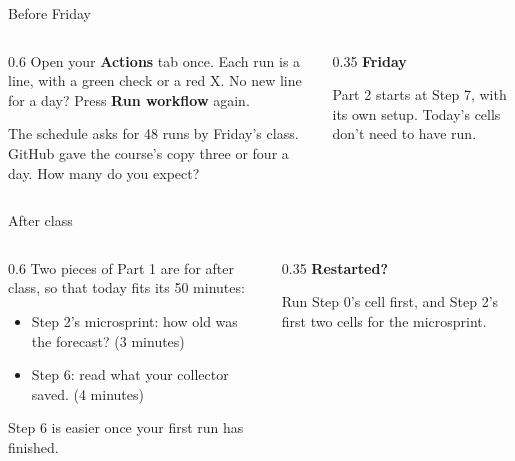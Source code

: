 \documentclass[9pt,aspectratio=169]{beamer}
\begin{document}
\begin{frame}{Before Friday}
    \begin{columns}[T]
        \begin{column}{0.6\textwidth}
            Open your \textbf{Actions} tab once. Each run is a line, with a green check or a red X. No new line for a day? Press \textbf{Run workflow} again.

            \medskip
            The schedule asks for 48 runs by Friday's class. GitHub gave the course's copy three or four a day. How many do you expect?
        \end{column}
        \begin{column}{0.35\textwidth}
            \textbf{Friday}\\[2pt]
            {\footnotesize Part 2 starts at Step 7, with its own setup. Today's cells don't need to have run.\par}
        \end{column}
    \end{columns}
\end{frame}

\begin{frame}{After class}
    \begin{columns}[T]
        \begin{column}{0.6\textwidth}
            Two pieces of Part 1 are for after class, so that today fits its 50 minutes:
            \begin{itemize}\small
                \item Step 2's microsprint: how old was the forecast? (3 minutes)
                \item Step 6: read what your collector saved. (4 minutes)
            \end{itemize}
            \medskip
            Step 6 is easier once your first run has finished.
        \end{column}
        \begin{column}{0.35\textwidth}
            \textbf{Restarted?}\\[2pt]
            {\footnotesize Run Step 0's cell first, and Step 2's first two cells for the microsprint.\par}
        \end{column}
    \end{columns}
\end{frame}
\end{document}
